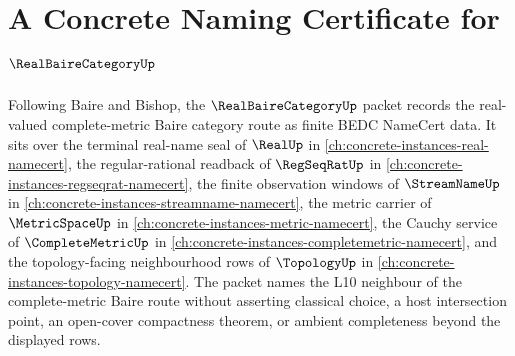 \chapter{A Concrete Naming Certificate for $\RealBaireCategoryUp$}
\label{ch:concrete-instances-real-baire-category-namecert}

Following Baire and Bishop, the $\RealBaireCategoryUp$ packet records the real-valued complete-metric Baire category route as finite BEDC NameCert data. It sits over the terminal real-name seal of $\RealUp$ in \autoref{ch:concrete-instances-real-namecert}, the regular-rational readback of $\RegSeqRatUp$ in \autoref{ch:concrete-instances-regseqrat-namecert}, the finite observation windows of $\StreamNameUp$ in \autoref{ch:concrete-instances-streamname-namecert}, the metric carrier of $\MetricSpaceUp$ in \autoref{ch:concrete-instances-metric-namecert}, the Cauchy service of $\CompleteMetricUp$ in \autoref{ch:concrete-instances-completemetric-namecert}, and the topology-facing neighbourhood rows of $\TopologyUp$ in \autoref{ch:concrete-instances-topology-namecert}. The packet names the L10 neighbour of the complete-metric Baire route without asserting classical choice, a host intersection point, an open-cover compactness theorem, or ambient completeness beyond the displayed rows.

